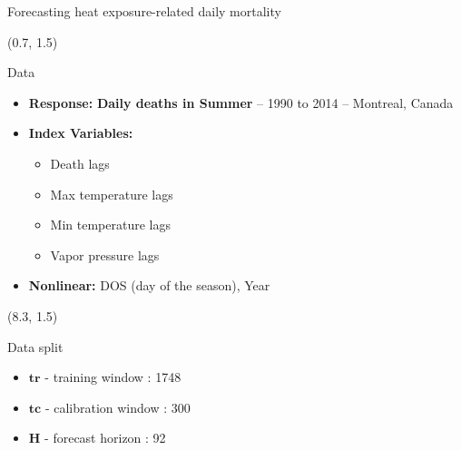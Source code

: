 \documentclass[
  12pt,
  ignorenonframetext,
  aspectratio=169,
]{beamer}
\begin{document}
\begin{frame}{Forecasting heat exposure-related daily mortality}
\label{forecasting-heat-exposure-related-daily-mortality-2}
\begin{textblock}{7}(0.7, 1.5)
\fontsize{11}{12}\sf
\begin{block}{Data}
  \begin{itemize}
    \item \color{violet} \textbf{Response:} \color{black} \textbf{Daily deaths in Summer} -- 1990 to 2014 -- Montreal, Canada
    \item \color{violet} \textbf{Index Variables:} 
      \begin{itemize}
        \item \color{black} Death lags
        \item \color{black} Max temperature lags
        \item \color{black} Min temperature lags
        \item \color{black} Vapor pressure lags
      \end{itemize}
    \item \color{violet}\textbf{Nonlinear:} \color{black} DOS (day of the season), Year \newline
  \end{itemize}
\end{block}
\end{textblock}

\begin{textblock}{7}(8.3, 1.5)
\fontsize{11}{12}\sf
\begin{block}{Data split}
  \begin{itemize}
  \item \color{violet} {$\bm{tr}$ - training window} : \color{black} 1748 \newline
  \item \color{violet} {$\bm{tc}$ - calibration window} : \color{black} 300 \newline
  \item \color{violet} {$\bm{H}$ - forecast horizon} : \color{black} 92 \newline \newline \newline \newline \newline
\end{itemize}
\end{block}
\end{textblock}
\end{frame}
\end{document}
